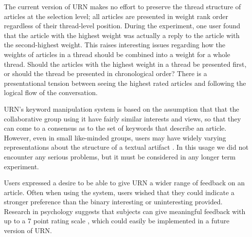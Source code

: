 The current version of URN makes no effort to preserve the thread structure
of articles at the selection level; all articles are presented in weight
rank order regardless of their thread-level position. During the
experiment, one user found that the article with the highest weight was
actually a reply to the article with the second-highest weight. This raises
interesting issues regarding how the weights of articles in a thread should
be combined into a weight for a whole thread. Should the articles with the
highest weight in a thread be presented first, or should the thread be
presented in chronological order? There is a presentational tension between
seeing the highest rated articles and following the logical flow of the
conversation.

URN's keyword manipulation system is based on the assumption that that the
collaborative group using it have fairly similar interests and views, so
that they can come to a consensus as to the set of keywords that describe
an article. However, even in small like-minded groups, users may have
widely varying representations about the structure of a textual artifact
\cite{csdl-93-14}. In this usage we did not encounter any serious
problems, but it must be considered in any longer term experiment.

Users expressed a desire to be able to give URN a wider range of feedback
on an article. Often when using the system, users wished that they could
indicate a stronger preference than the binary interesting or uninteresting
provided. Research in psychology suggests that subjects can give meaningful
feedback with up to a 7 point rating scale \cite{magic7}, which could
easily be implemented in a future version of URN.

